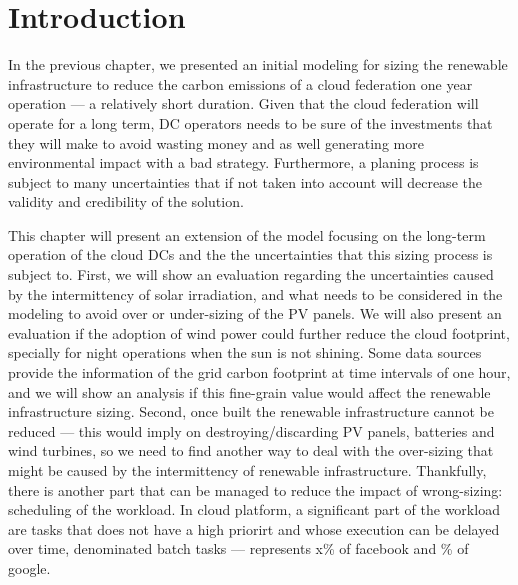 
\section{Introduction}


In the previous chapter, we presented an initial modeling for sizing the renewable infrastructure to reduce the carbon emissions of a cloud federation one year operation --- a relatively short duration. Given that the cloud federation will operate for a long term, DC operators needs to be sure of the investments that they will make to avoid wasting money and as well generating more environmental impact with a bad strategy. Furthermore, a planing process is subject to many uncertainties that if not taken into account will decrease the validity and credibility of the solution. 


This chapter will present an extension of the model focusing on the long-term operation of the cloud DCs and the the uncertainties that this sizing process is subject to. First, we will show an evaluation regarding the uncertainties caused by the intermittency of solar irradiation, and what needs to be considered in the modeling to avoid over or under-sizing of the PV panels. We will also present an evaluation if the adoption of wind power could further reduce the cloud footprint, specially for night operations when the sun is not shining. Some data sources provide the information of the grid carbon footprint at time intervals of one hour, and we will show an analysis if this fine-grain value would affect the renewable infrastructure sizing. Second, once built the renewable infrastructure cannot be reduced --- this would imply on destroying/discarding PV panels, batteries and wind turbines, so we need to find another way to deal with the over-sizing that might be caused by the intermittency of renewable infrastructure. Thankfully, there is another part that can be managed to reduce the impact of wrong-sizing: scheduling of the workload. In cloud platform, a significant part of the workload are tasks that does not have a high priorirt and whose execution can be delayed over time, denominated batch tasks --- represents x\% of facebook and \% of google. 



